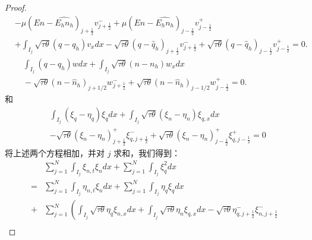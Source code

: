 \begin{proof}
\begin{equation}
\begin{aligned}
             & -\mu\left(E n-\widehat{E_{h} n_{h}}\right)_{j+\frac{1}{2}} v_{j+\frac{1}{2}}^{-}+\mu\left(E n-\widehat{E_{h} n_{h}}\right)_{j-\frac{1}{2}} v_{j-\frac{1}{2}}^{+}                                                                         \\
             & +\int_{I_{j}} \sqrt{\tau \theta}\left(q-q_{h}\right) v_{x} d x-\sqrt{\tau \theta}\left(q-\hat{q}_{h}\right)_{j+\frac{1}{2}} v_{j+\frac{1}{2}}^{-}+\sqrt{\tau \theta}\left(q-\hat{q}_{h}\right)_{j-\frac{1}{2}} v_{j-\frac{1}{2}}^{+}=0 . \\
             & \quad \int_{I_{j}}\left(q-q_{h}\right) w d x+\int_{I_{j}} \sqrt{\tau \theta}\left(n-n_{h}\right) w_{x} d x                                                                                                                               \\
             & \quad-\sqrt{\tau \theta}\left(n-\hat{n}_{h}\right)_{j+1 / 2} w_{j+\frac{1}{2}}^{-}+\sqrt{\tau \theta}\left(n-\hat{n}_{h}\right)_{j-1 / 2} w_{j-\frac{1}{2}}^{+}=0 .
        \end{aligned}
    \end{equation}
    和
    \begin{equation}
        \begin{split}
            & \int_{I_{j}}\left(\xi_{q}-\eta_{q}\right) \xi_{q} d x+\int_{I_{j}} \sqrt{\tau \theta}\left(\xi_{n}-\eta_{n}\right) \xi_{q, x} d x                                                                \\
            & -\sqrt{\tau \theta}\left(\xi_{n}-\eta_{n}\right)_{j+\frac{1}{2}}^{+} \xi_{q, j+\frac{1}{2}}^{-}+\sqrt{\tau \theta}\left(\xi_{n}-\eta_{n}\right)_{j-\frac{1}{2}}^{+} \xi_{q, j-\frac{1}{2}}^{+}=0
        \end{split}
    \end{equation}
    将上述两个方程相加，并对 $j$ 求和，我们得到：
    \begin{equation}
        \begin{split}
            & \sum_{j=1}^{N} \int_{I_{j}} \xi_{n, t} \xi_{n} d x+\sum_{j=1}^{N} \int_{I_{j}} \xi_{q}^{2} d x \\
            = & \sum_{j=1}^{N} \int_{I_{j}} \eta_{n, t} \xi_{n} d x+\sum_{j=1}^{N} \int_{I_{j}} \eta_{q} \xi_{q} d x \\
            + & \sum_{j=1}^{N}\left(\int_{I_{j}} \sqrt{\tau \theta} \eta_{q} \xi_{n, x} d x+\int_{I_{j}} \sqrt{\tau \theta} \eta_{n} \xi_{q, x} d x-\sqrt{\tau \theta} \eta_{q, j+\frac{1}{2}}^{-} \xi_{n, j+\frac{1}{2}}^{-}\right. \\

\end{split}
\end{equation}
\end{proof}
